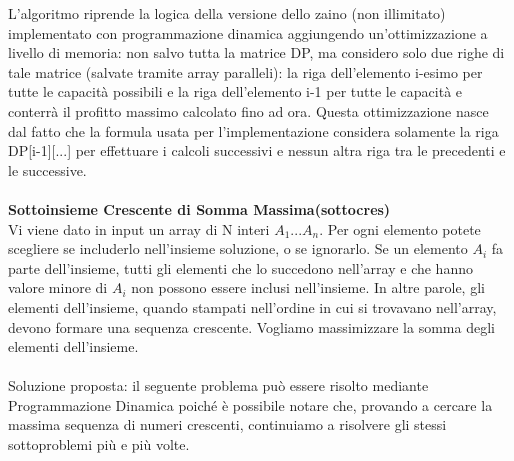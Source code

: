 \documentclass[../cheatSheetAlgoritmi.tex]{subfiles}
\begin{document}
L'algoritmo riprende la logica della versione dello zaino (non illimitato) implementato con programmazione dinamica aggiungendo un'ottimizzazione a livello di memoria: non salvo tutta la matrice DP, ma considero solo due righe di tale matrice (salvate tramite array paralleli): la riga dell'elemento i-esimo per tutte le capacità possibili e la riga dell'elemento i-1 per tutte le capacità e conterrà il profitto massimo calcolato fino ad ora. Questa ottimizzazione nasce dal fatto che la formula usata per l'implementazione considera solamente la riga DP[i-1][...] per effettuare i calcoli successivi e nessun altra riga tra le precedenti e le successive.\\\\
\textbf{Sottoinsieme Crescente di Somma Massima(sottocres)}\\
Vi viene dato in input un array di N interi $A_{1}...A_{n}$. Per ogni elemento potete scegliere se includerlo nell’insieme soluzione, o se ignorarlo. Se un elemento $A_{i}$ fa parte dell’insieme, tutti gli elementi che lo succedono nell’array e che hanno valore minore di $A_{i}$ non possono essere inclusi nell’insieme. In altre parole, gli elementi dell’insieme, quando stampati nell’ordine in cui si trovavano nell’array, devono formare una sequenza crescente.
Vogliamo massimizzare la somma degli elementi dell’insieme.\\\\
Soluzione proposta: il seguente problema può essere risolto mediante Programmazione Dinamica poiché è possibile notare che, provando a cercare la massima sequenza di numeri crescenti, continuiamo a risolvere gli stessi sottoproblemi più e più volte.
\end{document}
